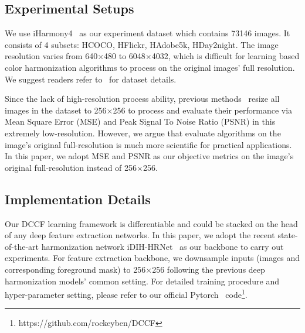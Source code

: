 \documentclass[runningheads]{llncs}
\begin{document}
    \subsection{Experimental Setups}
    We use iHarmony4~\cite{cong2020dovenet} as our experiment dataset which contains 73146 images. 
    It consists of 4 subsets: HCOCO, HFlickr, HAdobe5k, HDay2night.
    The image resolution varies from 640$\times$480 to 6048$\times$4032,
    which is difficult for learning based color harmonization algorithms to process on the original images' full resolution.
    We suggest readers refer to~\cite{cong2020dovenet} for dataset details.
    
    Since the lack of high-resolution process ability, previous methods~\cite{tsai2017deep, cun2020improving, sofiiuk2021foreground, Ling_2021_CVPR, cong2020dovenet, cong2021bargainnet, guo2021intrinsic} resize all images in the dataset to 256$\times$256 to process and evaluate their performance via Mean Square Error (MSE) and Peak Signal To Noise Ratio (PSNR) in this extremely low-resolution.
    However, we argue that evaluate algorithms on the image's original full-resolution is much more scientific for practical applications.
    In this paper, we adopt MSE and PSNR as our objective metrics on the image's original full-resolution instead of 256$\times$256.
    
    
    \subsection{Implementation Details}
    Our DCCF learning framework is differentiable and could be stacked on the head of any deep feature extraction networks.
    In this paper, we adopt the recent state-of-the-art harmonization network iDIH-HRNet~\cite{sofiiuk2021foreground} as our backbone to carry out experiments.
    For feature extraction backbone, we downsample inputs (images and corresponding foreground mask) to 256$\times$256 following the previous deep harmonization models' common setting.
For detailed training procedure and hyper-parameter setting, please refer to our official Pytorch~\cite{paszke2019pytorch} code\footnote{https://github.com/rockeyben/DCCF}.
\end{document}
